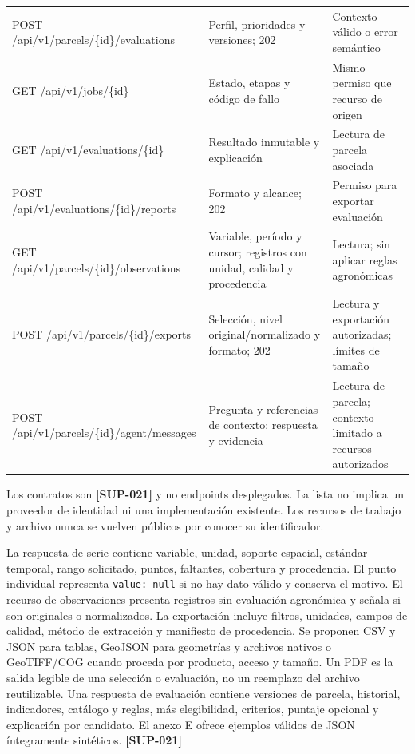 \documentclass[10pt,a4paper]{article}
\begin{document}
\begin{longtable}{>{\raggedright\arraybackslash}p{3.647cm}>{\raggedright\arraybackslash}p{5.867cm}>{\raggedright\arraybackslash}p{6.343cm}}
POST /\allowbreak{}api/\allowbreak{}v1/\allowbreak{}parcels/\allowbreak{}\{id\}/\allowbreak{}evaluations & Perfil, prioridades y versiones; 202 & Contexto válido o error semántico \\[3pt]
GET /\allowbreak{}api/\allowbreak{}v1/\allowbreak{}jobs/\allowbreak{}\{id\} & Estado, etapas y código de fallo & Mismo permiso que recurso de origen \\[3pt]
GET /\allowbreak{}api/\allowbreak{}v1/\allowbreak{}evaluations/\allowbreak{}\{id\} & Resultado inmutable y explicación & Lectura de parcela asociada \\[3pt]
POST /\allowbreak{}api/\allowbreak{}v1/\allowbreak{}evaluations/\allowbreak{}\{id\}/\allowbreak{}reports & Formato y alcance; 202 & Permiso para exportar evaluación \\[3pt]
GET /\allowbreak{}api/\allowbreak{}v1/\allowbreak{}parcels/\allowbreak{}\{id\}/\allowbreak{}observations & Variable, período y cursor; registros con unidad, calidad y procedencia & Lectura; sin aplicar reglas agronómicas \\[3pt]
POST /\allowbreak{}api/\allowbreak{}v1/\allowbreak{}parcels/\allowbreak{}\{id\}/\allowbreak{}exports & Selección, nivel original/\allowbreak{}normalizado y formato; 202 & Lectura y exportación autorizadas; límites de tamaño \\[3pt]
POST /\allowbreak{}api/\allowbreak{}v1/\allowbreak{}parcels/\allowbreak{}\{id\}/\allowbreak{}agent/\allowbreak{}messages & Pregunta y referencias de contexto; respuesta y evidencia & Lectura de parcela; contexto limitado a recursos autorizados \\[3pt]
\end{longtable}
\endgroup

Los contratos son \textbf{[SUP-021]} y no endpoints desplegados. La lista no implica un proveedor de identidad ni una implementación existente. Los recursos de trabajo y archivo nunca se vuelven públicos por conocer su identificador.


La respuesta de serie contiene variable, unidad, soporte espacial, estándar temporal, rango solicitado, puntos, faltantes, cobertura y procedencia. El punto individual representa \texttt{value: null} si no hay dato válido y conserva el motivo. El recurso de observaciones presenta registros sin evaluación agronómica y señala si son originales o normalizados. La exportación incluye filtros, unidades, campos de calidad, método de extracción y manifiesto de procedencia. Se proponen CSV y JSON para tablas, GeoJSON para geometrías y archivos nativos o GeoTIFF/\allowbreak{}COG cuando proceda por producto, acceso y tamaño. Un PDF es la salida legible de una selección o evaluación, no un reemplazo del archivo reutilizable. Una respuesta de evaluación contiene versiones de parcela, historial, indicadores, catálogo y reglas, más elegibilidad, criterios, puntaje opcional y explicación por candidato. El anexo E ofrece ejemplos válidos de JSON íntegramente sintéticos. \textbf{[SUP-021]}
\end{document}
